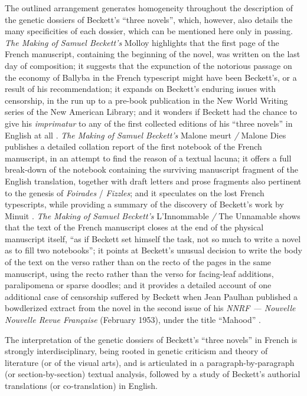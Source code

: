 \begin{paper}
The outlined arrangement generates homogeneity throughout the
description of the genetic dossiers of Beckett's ``three novels'',
which, however, also details the many specificities of each dossier,
which can be mentioned here only in passing. \emph{The Making of Samuel
Beckett's} Molloy highlights that the first page of the French
manuscript, containing the beginning of the novel, was written on the
last day of composition; it suggests that the expunction of the
notorious passage on the economy of Ballyba in the French typescript
might have been Beckett's, or a result of his recommendation; it expands
on Beckett's enduring issues with censorship, in the run up to a
pre-book publication in the New World Writing series of the New American
Library; and it wonders if Beckett had the chance to give his
\emph{imprimatur} to any of the first collected editions of his ``three
novels'' in English at all \citep[33, 65, 84--86 and 103]{oreilly_making_2017}. \emph{The Making of Samuel Beckett's} Malone meurt \emph{/} Malone
Dies publishes a detailed collation report of the first notebook of the
French manuscript, in an attempt to find the reason of a textual
lacuna; it offers a full break-down of the notebook containing the
surviving manuscript fragment of the English translation, together with
draft letters and prose fragments also pertinent to the genesis of
\emph{Foirades} / \emph{Fizzles}; and it speculates on the lost French
typescripts, while providing a summary of the discovery of Beckett's
work by Minuit \citep[40--43, 50--61 and 62--64]{van_hulle_making_2017}.
\emph{The Making of Samuel Beckett's} L'Innommable \emph{/} The
Unnamable shows that the text of the French manuscript closes at the end
of the physical manuscript itself, ``as if Beckett set himself the task,
not so much to write a novel as to fill two notebooks''; it points at
Beckett's unusual decision to write the body of the text on the verso
rather than on the recto of the pages in the same manuscript, using the
recto rather than the verso for facing-leaf additions, paralipomena or
sparse doodles; and it provides a detailed account of one additional
case of censorship suffered by Beckett when Jean Paulhan published a
bowdlerized extract from the novel in the second issue of his \emph{NNRF
--- Nouvelle Nouvelle Revue Française} (February 1953), under the title
``Mahood'' \citep[31, 32--33 and 59--67]{van_hulle_making_2014}.

The interpretation of the genetic dossiers of Beckett's ``three novels''
in French is strongly interdisciplinary, being rooted in genetic
criticism and theory of literature (or of the visual arts), and is
articulated in a paragraph-by-paragraph (or section-by-section) textual
analysis, followed by a study of Beckett's authorial translations (or
co-translation) in English.


\end{paper}
